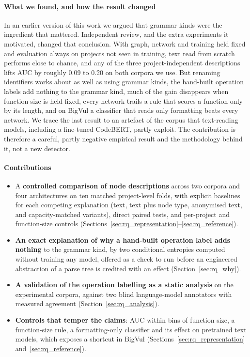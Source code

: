 \documentclass[pdflatex,sn-basic]{sn-jnl}
\theoremstyle{thmstyleone}%
\newcommand{\numdeltaMax}{0.20}
\newcommand{\numdeltaMin}{0.09}
\begin{document}
\paragraph{What we found, and how the result changed} In an earlier version of
this work we argued that grammar kinds were the ingredient that mattered.
Independent review, and the extra experiments it motivated, changed that
conclusion. With graph, network and training held fixed and evaluation always
on projects not seen in training, text read from scratch performs close to
chance, and any of the three project-independent descriptions lifts AUC by
roughly \numdeltaMin{} to \numdeltaMax{} on both corpora we use. But renaming identifiers works
about as well as using grammar kinds, the hand-built operation labels add
nothing to the grammar kind, much of the gain disappears when function size is
held fixed, every network trails a rule that scores a function only by its
length, and on BigVul a classifier that reads only formatting beats every
network. We trace the last result to an artefact of the corpus that
text-reading models, including a fine-tuned CodeBERT, partly exploit.
The contribution is therefore a careful, partly negative empirical result and
the methodology behind it, not a new detector.

\paragraph{Contributions}
\begin{itemize}
    \item A \textbf{controlled comparison of node descriptions} across two
          corpora and four architectures on ten matched project-level folds,
          with explicit baselines for each competing explanation (text, text
          plus node type, anonymised text, and capacity-matched variants),
          direct paired tests, and per-project and function-size controls
          (Sections~\ref{sec:rq_representation}--\ref{sec:rq_reference}).
    \item \textbf{An exact explanation of why a hand-built operation label adds
          nothing} to the grammar kind, by two conditional entropies computed
          without training any model, offered as a check to run before an
          engineered abstraction of a parse tree is credited with an effect
          (Section~\ref{sec:rq_why}).
    \item \textbf{A validation of the operation labelling as a static analysis}
          on the experimental corpora, against two blind language-model
          annotators with measured agreement (Section~\ref{sec:rq_analysis}).
    \item \textbf{Controls that temper the claims}: AUC within bins of function
          size, a function-size rule, a formatting-only classifier and its effect
          on pretrained text models, which exposes a shortcut in BigVul
          (Sections~\ref{sec:rq_representation}
          and~\ref{sec:rq_reference}).
\end{itemize}
\end{document}
